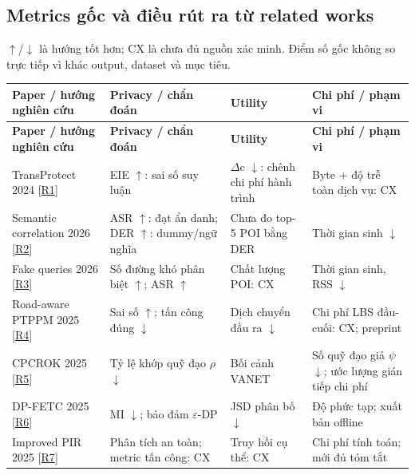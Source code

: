 \subsection{Metrics gốc và điều rút ra từ related works}
$\uparrow$/$\downarrow$ là hướng tốt hơn; CX là chưa đủ nguồn xác minh. Điểm số gốc không so trực tiếp vì khác output, dataset và mục tiêu.

\begingroup\small
\begin{longtable}{@{}P{3.871cm}P{4.355cm}P{3.871cm}P{4.258cm}@{}}
\toprule
\textbf{Paper / hướng nghiên cứu} & \textbf{Privacy / chẩn đoán} & \textbf{Utility} & \textbf{Chi phí / phạm vi}\\\midrule
\endfirsthead
\toprule
\textbf{Paper / hướng nghiên cứu} & \textbf{Privacy / chẩn đoán} & \textbf{Utility} & \textbf{Chi phí / phạm vi}\\\midrule
\endhead
\bottomrule\endfoot
TransProtect 2024 [\href{https://arxiv.org/html/2409.09495v1}{R1}] & EIE $\uparrow$: sai số suy luận & $\Delta$c $\downarrow$: chênh chi phí hành trình & Byte + độ trễ toàn dịch vụ: CX\\
\addlinespace[3pt]
Semantic correlation 2026 [\href{https://link.springer.com/article/10.1007/s44443-026-00899-w}{R2}] & ASR $\uparrow$: đạt ẩn danh; DER $\uparrow$: dummy/ngữ nghĩa & Chưa đo top-5 POI bằng DER & Thời gian sinh $\downarrow$\\
\addlinespace[3pt]
Fake queries 2026 [\href{https://link.springer.com/article/10.1007/s44443-025-00438-z}{R3}] & Số đường khó phân biệt $\uparrow$; ASR $\uparrow$ & Chất lượng POI: CX & Thời gian sinh, RSS $\downarrow$\\
\addlinespace[3pt]
Road-aware PTPPM 2025 [\href{https://arxiv.org/html/2511.21020v1}{R4}] & Sai số $\uparrow$; tấn công đúng $\downarrow$ & Dịch chuyển đầu ra $\downarrow$ & Chi phí LBS đầu-cuối: CX; preprint\\
\addlinespace[3pt]
CPCROK 2025 [\href{https://uhra.herts.ac.uk/id/eprint/25705/1/futureinternet-17-00165.pdf}{R5}] & Tỷ lệ khớp quỹ đạo $\rho$ $\downarrow$ & Bối cảnh VANET & Số quỹ đạo giả $\psi$ $\downarrow$; ước lượng gián tiếp chi phí\\
\addlinespace[3pt]
DP-FETC 2025 [\href{https://www.aimspress.com/aimspress-data/era/2025/11/PDF/era-33-11-293.pdf}{R6}] & MI $\downarrow$; bảo đảm $\varepsilon$-DP & JSD phân bố $\downarrow$ & Độ phức tạp; xuất bản offline\\
\addlinespace[3pt]
Improved PIR 2025 [\href{https://onlinelibrary.wiley.com/doi/abs/10.1002/cpe.70447}{R7}] & Phân tích an toàn; metric tấn công: CX & Truy hồi cụ thể: CX & Chi phí tính toán; mới đủ tóm tắt\\

\end{longtable}
